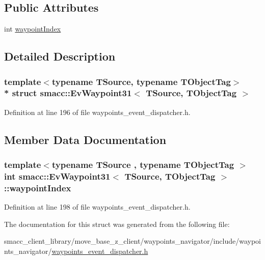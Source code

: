 \subsection*{Public Attributes}
\begin{DoxyCompactItemize}
\item 
int \hyperlink{structsmacc_1_1EvWaypoint31_a24b52ef2a058297f06e5196869ea3aae}{waypoint\+Index}
\end{DoxyCompactItemize}


\subsection{Detailed Description}
\subsubsection*{template$<$typename T\+Source, typename T\+Object\+Tag$>$\\*
struct smacc\+::\+Ev\+Waypoint31$<$ T\+Source, T\+Object\+Tag $>$}



Definition at line 196 of file waypoints\+\_\+event\+\_\+dispatcher.\+h.



\subsection{Member Data Documentation}
\subsubsection[{\texorpdfstring{waypoint\+Index}{waypointIndex}}]{\setlength{\rightskip}{0pt plus 5cm}template$<$typename T\+Source , typename T\+Object\+Tag $>$ int {\bf smacc\+::\+Ev\+Waypoint31}$<$ T\+Source, T\+Object\+Tag $>$\+::waypoint\+Index}\hypertarget{structsmacc_1_1EvWaypoint31_a24b52ef2a058297f06e5196869ea3aae}{}\label{structsmacc_1_1EvWaypoint31_a24b52ef2a058297f06e5196869ea3aae}


Definition at line 198 of file waypoints\+\_\+event\+\_\+dispatcher.\+h.



The documentation for this struct was generated from the following file\+:\begin{DoxyCompactItemize}
\item 
smacc\+\_\+client\+\_\+library/move\+\_\+base\+\_\+z\+\_\+client/waypoints\+\_\+navigator/include/waypoints\+\_\+navigator/\hyperlink{waypoints__event__dispatcher_8h}{waypoints\+\_\+event\+\_\+dispatcher.\+h}\end{DoxyCompactItemize}
